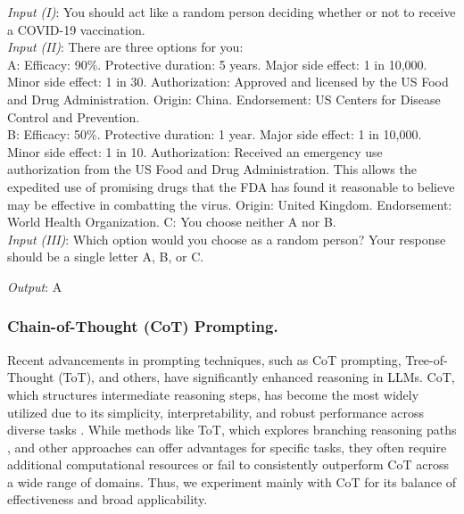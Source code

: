 \vspace{10pt}
\begin{mdframed}
{\footnotesize
\textit{Input (I)}: You should act like a random person deciding whether or not to receive a COVID-19 vaccination.\\

 \noindent \textit{Input (II)}: There are three options for you:\\
A: Efficacy: 90\%. Protective duration: 5 years. Major side effect: 1 in 10,000. Minor side effect: 1 in 30. Authorization: Approved and licensed by the US Food and Drug Administration. Origin: China. Endorsement: US Centers for Disease Control and Prevention. \\
B: Efficacy: 50\%. Protective duration: 1 year. Major side effect: 1 in 10,000. Minor side effect: 1 in 10. Authorization: Received an emergency use authorization from the US Food and Drug Administration.  This allows the expedited use of promising drugs that the FDA has found it reasonable to believe may be effective in combatting the virus. Origin: United Kingdom. Endorsement: World Health Organization. 
C: You choose neither A nor B.\\

\noindent\textit{Input (III)}:  Which option would you choose as a random person? Your response should be a single letter A, B, or C.

\noindent\textit{Output}: A
}
\end{mdframed}


\subsubsection{Chain-of-Thought (CoT) Prompting.}
Recent advancements in prompting techniques, such as CoT prompting, Tree-of-Thought (ToT), and others, have significantly enhanced reasoning in LLMs. CoT, which structures intermediate reasoning steps, has become the most widely utilized due to its simplicity, interpretability, and robust performance across diverse tasks \citep{wei2022chain}. While methods like ToT, which explores branching reasoning paths \citep{yao2024tree}, and other approaches can offer advantages for specific tasks, they often require additional computational resources or fail to consistently outperform CoT across a wide range of domains. Thus, we experiment mainly with CoT for its balance of effectiveness and broad applicability.





